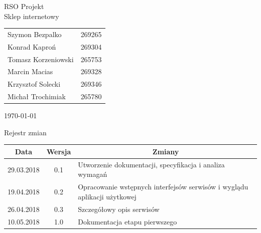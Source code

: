 \documentclass[11pt,a4paper,twoside]{article}
\begin{document}
\begin{center}
\vspace*{3\baselineskip}
{\LARGE{RSO Projekt}}
\\
\vspace*{2\baselineskip}
{\Large{Sklep internetowy}}
\\
\vspace*{2\baselineskip}
\begin{table}[ht]
\label{autors}
\centering
\begin{tabular}{ll}
	Szymon Bezpalko & 269265\\
	Konrad Kaproń & 269304\\
	Tomasz Korzeniowski & 265753\\
	Marcin Macias & 269328\\
	Krzysztof Solecki & 269346\\
	Michał Trochimiak & 265780\\
\end{tabular}
\end{table}

\vspace*{2\baselineskip}
\today
\end{center}
\vspace*{3\baselineskip}
\begin{center}
Rejestr zmian
\end{center}

\begin{table}[ht]
\label{changelog}
\centering
\begin{tabular}{|c|c|l|}
\hline
 Data & Wersja & \multicolumn{1}{c|}{Zmiany} \\\hline
 29.03.2018 & 0.1 & Utworzenie dokumentacji, specyfikacja i analiza wymagań \\\hline
 19.04.2018 & 0.2 & Opracowanie wstępnych interfejsów serwisów i wyglądu aplikacji użytkowej \\\hline
 26.04.2018 & 0.3 & Szczegółowy opis serwisów \\\hline
 10.05.2018 & 1.0 & Dokumentacja etapu pierwszego\\\hline
\end{tabular}
\end{table}
\newpage
\tableofcontents
\end{document}
